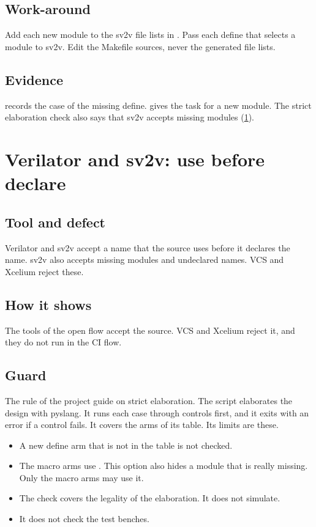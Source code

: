 \subsection*{Work-around}
Add each new module to the sv2v file lists in . Pass each define that selects a module to sv2v. Edit the Makefile sources, never the generated file lists.

\subsection*{Evidence}
 records the case of the missing define.  gives the task for a new module. The strict elaboration check also says that sv2v accepts missing modules (\cref{tm:defect:use-before-declare}).

\section{Verilator and sv2v: use before declare}\label{tm:defect:use-before-declare}
\subsection*{Tool and defect}
Verilator and sv2v accept a name that the source uses before it declares the name. sv2v also accepts missing modules and undeclared names. VCS and Xcelium reject these.

\subsection*{How it shows}
The tools of the open flow accept the source. VCS and Xcelium reject it, and they do not run in the CI flow.

\subsection*{Guard}
The rule of the project guide on strict elaboration. The script  elaborates the design with pyslang. It runs each case through controls first, and it exits with an error if a control fails. It covers the arms of its  table. Its limits are these.
\begin{itemize}
  \item A new define arm that is not in the table is not checked.
  \item The macro arms use . This option also hides a module that is really missing. Only the macro arms may use it.
  \item The check covers the legality of the elaboration. It does not simulate.
  \item It does not check the test benches.
\end{itemize}

